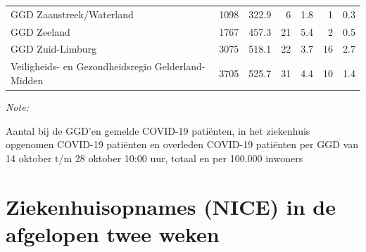 \documentclass[
  english,
  man,floatsintext]{apa6}
\begin{document}
\begin{table}
\begin{threeparttable}
\begin{tabular}{lrrrrrr}
GGD Zaanstreek/Waterland & 1098 & 322.9 & 6 & 1.8 & 1 & 0.3\\
GGD Zeeland & 1767 & 457.3 & 21 & 5.4 & 2 & 0.5\\
GGD Zuid-Limburg & 3075 & 518.1 & 22 & 3.7 & 16 & 2.7\\
Veiligheids- en Gezondheidsregio Gelderland-Midden & 3705 & 525.7 & 31 & 4.4 & 10 & 1.4\\
\bottomrule
\end{tabular}
\begin{tablenotes}
\item \textit{Note: } 
\item Aantal bij de GGD’en gemelde COVID-19 patiënten, in het ziekenhuis opgenomen COVID-19 patiënten en overleden COVID-19 patiënten per GGD van 14 oktober t/m 28 oktober 10:00 uur, totaal en per 100.000 inwoners
\end{tablenotes}
\end{threeparttable}
\endgroup{}
\end{table}

\newpage

\hypertarget{ziekenhuisopnames-nice-in-de-afgelopen-twee-weken}{%
\section{Ziekenhuisopnames (NICE) in de afgelopen twee weken}\label{ziekenhuisopnames-nice-in-de-afgelopen-twee-weken}}
\end{document}
